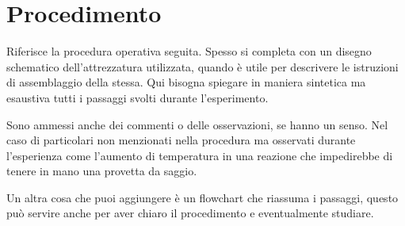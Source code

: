 \section{Procedimento}
Riferisce la procedura  operativa seguita. Spesso si completa con un disegno schematico dell'attrezzatura utilizzata, quando è utile per descrivere le istruzioni di assemblaggio della stessa.
Qui bisogna spiegare in maniera sintetica ma esaustiva tutti i passaggi svolti durante l'esperimento.

Sono ammessi anche dei commenti o delle osservazioni, se hanno un senso. Nel caso di particolari non menzionati nella procedura ma osservati durante l'esperienza come l'aumento di temperatura in una reazione che impedirebbe di tenere in mano una provetta da saggio.



Un altra cosa che puoi aggiungere è un flowchart che riassuma i passaggi, questo può servire anche per aver chiaro il procedimento e eventualmente studiare.

